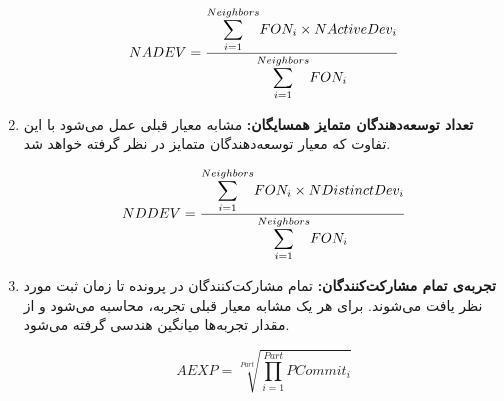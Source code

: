 \begin{enumerate}
	
	\begin{latin}
		\[
		NADEV = \frac{\mathlarger{\sum}\limits_{i=1}^{Neighbors} FON_i \times NActiveDev_i}{\mathlarger{\sum}\limits_{i=1}^{Neighbors}FON_i}
		\]
	\end{latin}
	\item
	\textbf{تعداد توسعه‌دهندگان متمایز همسایگان:}
	مشابه معیار قبلی عمل می‌شود با این تفاوت که معیار توسعه‌دهندگان متمایز در نظر گرفته خواهد شد.

\begin{latin}
\[
NDDEV = \frac{\mathlarger{\sum}\limits_{i=1}^{Neighbors} FON_i \times NDistinctDev_i}{\mathlarger{\sum}\limits_{i=1}^{Neighbors}FON_i}
\]
\end{latin}

	\item
	\textbf{تجربه‌ی تمام مشارکت‌کنندگان:}
	تمام مشارکت‌کنندگان در پرونده تا زمان ثبت مورد نظر یافت می‌شوند. برای هر یک مشابه معیار قبلی تجربه، محاسبه می‌شود و از مقدار تجربه‌ها میانگین هندسی گرفته می‌شود. 
\begin{latin}
	\[
	AEXP = \sqrt[Part]{ \prod\limits_{i=1}^{Part}PCommit_i}
	\]
\end{latin}	
	
\end{enumerate}
 
